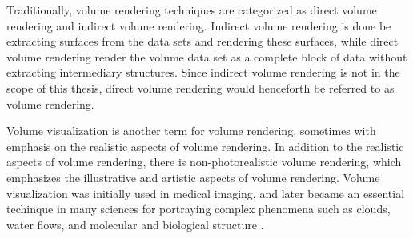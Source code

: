 
Traditionally, volume rendering techniques are categorized as direct volume rendering and indirect volume rendering.
Indirect volume rendering is done be extracting surfaces from the data sets and rendering these surfaces, while direct volume rendering render the volume data set as a complete block of data without extracting intermediary structures.
Since indirect volume rendering is not in the scope of this thesis, direct volume rendering would henceforth be referred to as volume rendering.

Volume visualization is another term for volume rendering, sometimes with emphasis on the realistic aspects of volume rendering. In addition to the realistic aspects of volume rendering, there is non-photorealistic volume rendering, which emphasizes the illustrative and artistic aspects of volume rendering.
Volume visualization was initially used in medical imaging, and later became an essential techinque in many sciences for portraying complex phenomena such as clouds, water flows, and molecular and biological structure \cite{rosenblum_scientific_1994}.

